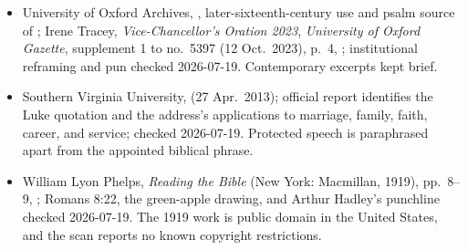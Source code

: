 {\begin{itemize}[itemsep=0em,topsep=0.15em,parsep=0pt]
\item University of Oxford Archives, , later-sixteenth-century use and psalm source of ; Irene Tracey, \emph{Vice-Chancellor's Oration 2023}, \emph{University of Oxford Gazette}, supplement 1 to no.~5397 (12 Oct.~2023), p.~4, ; institutional reframing and  pun checked 2026-07-19. Contemporary excerpts kept brief.
\item Southern Virginia University,  (27 Apr.~2013); official report identifies the Luke quotation and the address's applications to marriage, family, faith, career, and service; checked 2026-07-19. Protected speech is paraphrased apart from the appointed biblical phrase.
\item William Lyon Phelps, \emph{Reading the Bible} (New York: Macmillan, 1919), pp.~8--9, ; Romans 8:22, the green-apple drawing, and Arthur Hadley's punchline checked 2026-07-19. The 1919 work is public domain in the United States, and the scan reports no known copyright restrictions.
\end{itemize}
}

